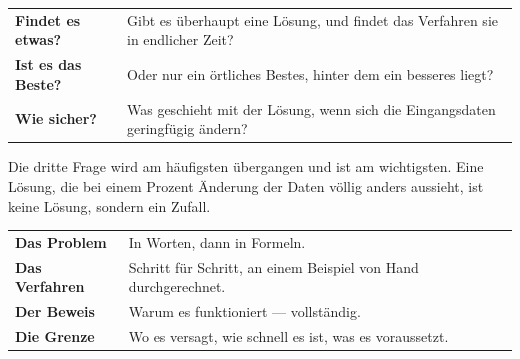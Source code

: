 \begin{merksatz}
\begin{center}
{\small
\renewcommand{\arraystretch}{1.55}
\begin{tabular}{@{}P{2.4cm}P{6.2cm}@{}}
\toprule
\textbf{Findet es etwas?} & Gibt es überhaupt eine Lösung, und findet das Verfahren sie in endlicher Zeit?\\
\textbf{Ist es das Beste?} & Oder nur ein örtliches Bestes, hinter dem ein besseres liegt?\\
\textbf{Wie sicher?} & Was geschieht mit der Lösung, wenn sich die Eingangsdaten geringfügig ändern?\\
\bottomrule
\end{tabular}}
\end{center}

\begin{center}
\begin{minipage}{0.9\textwidth}
Die dritte Frage wird am häufigsten übergangen und ist am wichtigsten. Eine Lösung, die bei einem Prozent Änderung der Daten völlig anders aussieht, ist keine Lösung, sondern ein Zufall.
\end{minipage}
\end{center}

\begin{center}
\begin{minipage}{0.88\textwidth}
\end{minipage}
\end{center}
\end{merksatz}

\begin{warnung}
\begin{center}
\renewcommand{\arraystretch}{1.5}
\begin{tabular}{@{}P{2.4cm}P{6.2cm}@{}}
\toprule
\textbf{Das Problem} & In Worten, dann in Formeln.\\
\textbf{Das Verfahren} & Schritt für Schritt, an einem Beispiel von Hand durchgerechnet.\\
\textbf{Der Beweis} & Warum es funktioniert --- vollständig.\\
\textbf{Die Grenze} & Wo es versagt, wie schnell es ist, was es voraussetzt.\\
\bottomrule
\end{tabular}
\end{center}

\begin{center}
\begin{minipage}{0.88\textwidth}
\end{minipage}
\end{center}
\end{warnung}

